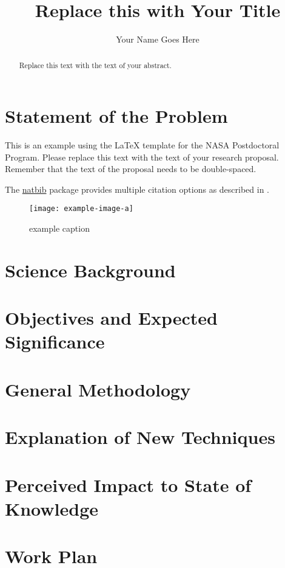 \documentclass[final,letterpaper,oneside,12pt]{article}
\title{Replace this with Your Title}  %
\author{Your Name Goes Here}  %
\begin{document}
\maketitle

\begin{abstract}
	Replace this text with the text of your abstract.
\end{abstract}

\section{Statement of the Problem}

This is an example using the \LaTeX{} template for the NASA Postdoctoral Program.  Please replace this text with the text of your research proposal. Remember that the text of the proposal needs to be double-spaced.

The \href{http://merkel.texture.rocks/Latex/natbib.php}{natbib} package provides multiple citation options as described in \citet{natbib:2010}.

\begin{figure}[htbp] %
   \centering
   \texttt{[image: example-image-a]}
   \caption{example caption}
   \label{fig:example}
\end{figure}

\section{Science Background}

\section{Objectives and Expected Significance}

\section{General Methodology}

\section{Explanation of New Techniques}

\section{Perceived Impact to State of Knowledge}

\section{Work Plan}

\newpage
\singlespacing
\setlength{\bibsep}{0ex}


\end{document}
